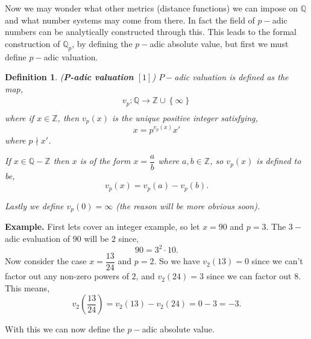 \documentclass[12pt]{article}
\newtheorem{mydef}[thm]{Definition}
\theoremstyle{definition}
\theoremstyle{remark}
\newcommand{\zz}{\mathbb Z}   %
\newcommand{\qq}{\mathbb Q}   %
\newcommand{\set}[1]{\left\{#1\right\}} %
\newcommand{\lrp}[1]{\left(#1\right)}
\newcommand{\lrb}[1]{\left[#1\right]}
\begin{document}
  Now we may wonder what other metrics (distance functions) we can impose on $\qq$ and what number systems may come from there. In fact the field of $p-$adic numbers can be analytically constructed through this. This leads to the formal construction of $\qq_p$, by defining the $p-$adic absolute value, but first we must define $p-$adic valuation.

  \begin{mydef} (\textbf{P-adic valuation} $\lrb{1}$)
    $P-$adic valuation is defined as the map,
    \begin{align*}
      v_p: \qq \to \zz \cup \set{\infty} \\
    \end{align*}
    where if $x \in \zz$, then $v_p(x)$ is the unique positive integer satisfying,
    \[x = p^{v_p(x)}x'\]
    where $p \nmid x'$.

    If $x \in \qq- \zz$ then $x$ is of the form $x = \dfrac{a}{b}$ where $a,b \in \zz$, so $v_p(x)$ is defined to be,
    \[v_p(x) = v_p(a) - v_p(b).\]

    Lastly we define $v_p(0) = \infty$ (the reason will be more obvious soon). 
  \end{mydef}

  \textbf{Example.} First lets cover an integer example, so let $x = 90$ and $p = 3$. The $3-$adic evaluation of $90$ will be $2$ since,
  \[90 = 3^{2}\cdot 10.\]
  Now consider the case $x = \dfrac{13}{24}$ and $p = 2$. So we have $v_2(13) = 0$ since we can't factor out any non-zero powers of $2$, and $v_2(24) = 3$ since we can factor out $8$. This means,
  \[v_2\lrp{\dfrac{13}{24}} = v_2(13) - v_2(24) = 0 -3 = -3.\]
  
  With this we can now define the $p-$adic absolute value.
\end{document}
